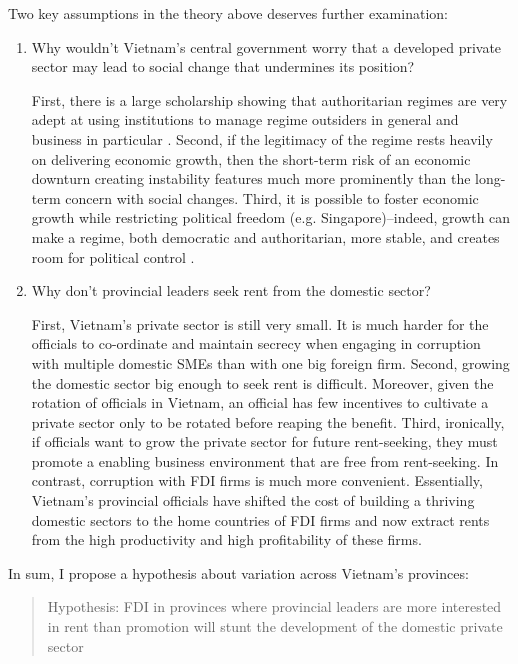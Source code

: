 \documentclass[12pt]{article}
\begin{document}
Two key assumptions in the theory above deserves further examination:
\begin{enumerate}
\item Why wouldn't Vietnam's central government worry that a developed private sector may lead to social change that undermines its position?

First, there is a large scholarship showing that authoritarian regimes are very adept at using institutions to manage regime outsiders in general and business in particular \citep{Gandhi2006, Gandhi2008, Wright2008, Le2015}. Second, if the legitimacy of the regime rests heavily on delivering economic growth, then the short-term risk of an economic downturn creating instability features much more prominently than the long-term concern with social changes. Third, it is possible to foster economic growth while restricting political freedom (e.g. Singapore)--indeed, growth can make a regime, both democratic and authoritarian, more stable, and creates room for political control \citep{Przeworski1997}.

\item Why don't provincial leaders seek rent from the domestic sector? 

First, Vietnam's private sector is still very small. It is much harder for the officials to co-ordinate and maintain secrecy when engaging in corruption with multiple domestic SMEs than with one big foreign firm. Second, growing the domestic sector big enough to seek rent is difficult. Moreover, given the rotation of officials in Vietnam, an official has few incentives to cultivate a private sector only to be rotated before reaping the benefit. Third, ironically, if officials want to grow the private sector for future rent-seeking, they must promote a enabling business environment that are free from rent-seeking. In contrast, corruption with FDI firms is much more convenient. Essentially, Vietnam's provincial officials have shifted the cost of building a thriving domestic sectors to the home countries of FDI firms and now extract rents from the high productivity and high profitability of these firms. 

\end{enumerate}


In sum, I propose a hypothesis about variation across Vietnam's provinces:

\begin{quote}
Hypothesis: FDI in provinces where provincial leaders are more interested in rent than promotion will stunt the development of the domestic private sector
\end{quote}
\end{document}

